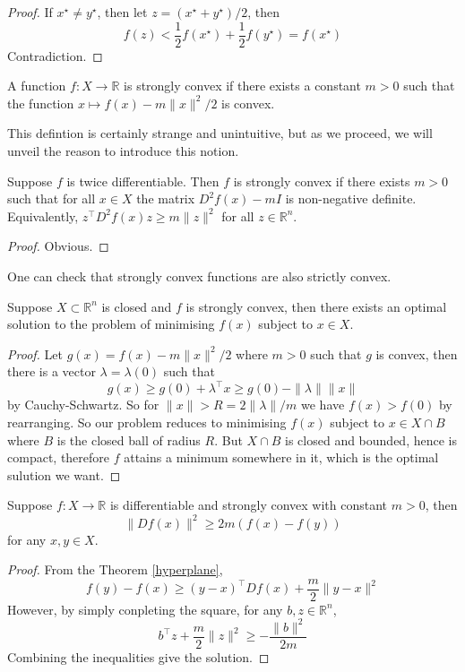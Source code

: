 \begin{proof}
    If $x^\star\neq y^\star$, then let $z=(x^\star+y^\star)/2$, then
    $$f(z)<\frac{1}{2}f(x^\star)+\frac{1}{2}f(y^\star)=f(x^\star)$$
    Contradiction.
\end{proof}
\begin{definition}
    A function $f:X\to\mathbb R$ is strongly convex if there exists a constant $m>0$ such that the function $x\mapsto f(x)-m\|x\|^2/2$ is convex.
\end{definition}
This defintion is certainly strange and unintuitive, but as we proceed, we will unveil the reason to introduce this notion.
\begin{theorem}
    Suppose $f$ is twice differentiable.
    Then $f$ is strongly convex if there exists $m>0$ such that for all $x\in X$ the matrix $D^2f(x)-mI$ is non-negative definite.
    Equivalently, $z^\top D^2f(x)z\ge m\|z\|^2$ for all $z\in\mathbb R^n$.
\end{theorem}
\begin{proof}
    Obvious.
\end{proof}
One can check that strongly convex functions are also strictly convex.
\begin{theorem}
    Suppose $X\subset\mathbb R^n$ is closed and $f$ is strongly convex, then there exists an optimal solution to the problem of minimising $f(x)$ subject to $x\in X$.
\end{theorem}
\begin{proof}
    Let $g(x)=f(x)-m\|x\|^2/2$ where $m>0$ such that $g$ is convex, then there is a vector $\lambda=\lambda(0)$ such that
    $$g(x)\ge g(0)+\lambda^\top x\ge g(0)-\|\lambda\|\|x\|$$
    by Cauchy-Schwartz.
    So for $\|x\|>R=2\|\lambda\|/m$ we have $f(x)>f(0)$ by rearranging.
    So our problem reduces to minimising $f(x)$ subject to $x\in X\cap B$ where $B$ is the closed ball of radius $R$.
    But $X\cap B$ is closed and bounded, hence is compact, therefore $f$ attains a minimum somewhere in it, which is the optimal sulution we want.
\end{proof}
\begin{theorem}\label{gradient_lower_bound}
    Suppose $f:X\to\mathbb R$ is differentiable and strongly convex with constant $m>0$, then
    $$\|Df(x)\|^2\ge 2m(f(x)-f(y))$$
    for any $x,y\in X$.
\end{theorem}
\begin{proof}
    From the Theorem \ref{hyperplane},
    $$f(y)-f(x)\ge(y-x)^\top Df(x)+\frac{m}{2}\|y-x\|^2$$
    However, by simply conpleting the square, for any $b,z\in\mathbb R^n$,
    $$b^\top z+\frac{m}{2}\|z\|^2\ge-\frac{\|b\|^2}{2m}$$
    Combining the inequalities give the solution.
\end{proof}
